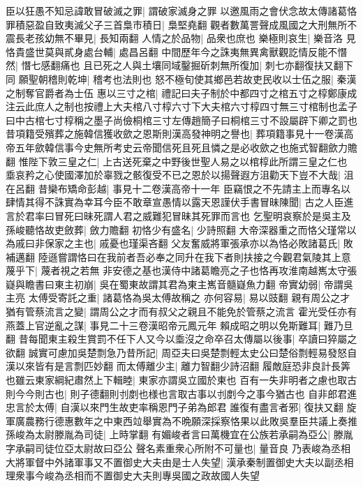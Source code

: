 臣以狂愚不知忌諱敢冒破滅之罪|{
	謂破家滅身之罪}
以邀風雨之會伏念故太傳諸葛恪罪積惡盈自致夷滅父子三首梟市積日|{
	梟堅堯翻}
觀者數萬詈聲成風國之大刑無所不震長老孩幼無不畢見|{
	長知兩翻}
人情之於品物|{
	品衆也庶也}
樂極則哀生|{
	樂音洛}
見恪貴盛世莫與貳身處台輔|{
	處昌呂翻}
中間歷年今之誅夷無異禽獸觀訖情反能不憯然|{
	憯七感翻痛也}
且已死之人與土壤同域鑿掘斫刺無所復加|{
	刺七亦翻復扶又翻下同}
願聖朝稽則乾坤|{
	稽考也法則也}
怒不極旬使其鄉邑若故吏民收以士伍之服|{
	秦漢之制奪官爵者為士伍}
惠以三寸之棺|{
	禮記曰夫子制於中都四寸之棺五寸之椁鄭康成注云此庶人之制也按禮上大夫棺八寸椁六寸下大夫棺六寸椁四寸無三寸棺制也孟子曰中古棺七寸椁稱之墨子尚儉桐棺三寸左傳趙簡子曰桐棺三寸不設屬辟下卿之罰也}
昔項籍受殯葬之施韓信獲收歛之恩斯則漢高發神明之譽也|{
	葬項籍事見十一卷漢高帝五年歛韓信事今史無所考史云帝聞信死且死且憐之是必收歛之也施式智翻歛力贍翻}
惟陛下敦三皇之仁|{
	上古送死棄之中野後世聖人易之以棺椁此所謂三皇之仁也}
埀哀矜之心使國澤加於辜戮之骸復受不已之恩於以揚聲遐方沮勸天下豈不大哉|{
	沮在呂翻}
昔欒布矯命彭越|{
	事見十二卷漢高帝十一年}
臣竊恨之不先請主上而專名以肆情其得不誅實為幸耳今臣不敢章宣愚情以露天恩謹伏手書冒昧陳聞|{
	古之人臣進言於君率曰冒死曰昧死謂人君之威難犯冒昧其死罪而言也}
乞聖明哀察於是吳主及孫峻聽恪故吏斂葬|{
	斂力贍翻}
初恪少有盛名|{
	少詩照翻}
大帝深器重之而恪父瑾常以為戚曰非保家之主也|{
	戚憂也瑾渠吝翻}
父友奮威將軍張承亦以為恪必敗諸葛氏|{
	敗補邁翻}
陸遜嘗謂恪曰在我前者吾必奉之同升在我下者則扶接之今觀君氣陵其上意蔑乎下|{
	蔑者視之若無}
非安德之基也漢侍中諸葛瞻亮之子也恪再攻淮南越嶲太守張嶷與瞻書曰東主初崩|{
	吳在蜀東故謂其君為東主嶲音髓嶷魚力翻}
帝實幼弱|{
	帝謂吳主亮}
太傅受寄託之重|{
	諸葛恪為吳太傅故稱之}
亦何容易|{
	易以豉翻}
親有周公之才猶有管蔡流言之變|{
	謂周公之才而有叔父之親且不能免於管蔡之流言}
霍光受任亦有燕蓋上官逆亂之謀|{
	事見二十三卷漢昭帝元鳳元年}
賴成昭之明以免斯難耳|{
	難乃旦翻}
昔每聞東主殺生賞罰不任下人又今以埀沒之命卒召太傳屬以後事|{
	卒讀曰猝屬之欲翻}
誠實可慮加吳楚剽急乃昔所記|{
	周亞夫曰吳楚剽輕太史公曰楚俗剽輕易發怒自漢以來皆有是言剽匹妙翻}
而太傅離少主|{
	離力智翻少詩沼翻}
履敵庭恐非良計長筭也雖云東家綱紀肅然上下輯睦|{
	東家亦謂吳立國於東也}
百有一失非明者之慮也取古則今今則古也|{
	則子德翻則刌剫也様也言取古事以刌剫今之事今猶古也}
自非郎君進忠言於太傅|{
	自漢以來門生故吏率稱恩門子弟為郎君}
誰復有盡言者邪|{
	復扶又翻}
旋軍廣農務行德惠數年之中東西竝舉實為不晩願深採察恪果以此敗吳羣臣共議上奏推孫峻為太尉滕胤為司徒|{
	上時掌翻}
有媚峻者言曰萬機宜在公族若承嗣為亞公|{
	滕胤字承嗣司徒位亞太尉故曰亞公}
聲名素重衆心所附不可量也|{
	量音良}
乃表峻為丞相大將軍督中外諸軍事又不置御史大夫由是士人失望|{
	漢承秦制置御史大夫以副丞相理衆事今峻為丞相而不置御史大夫則專吳國之政故國人失望}
